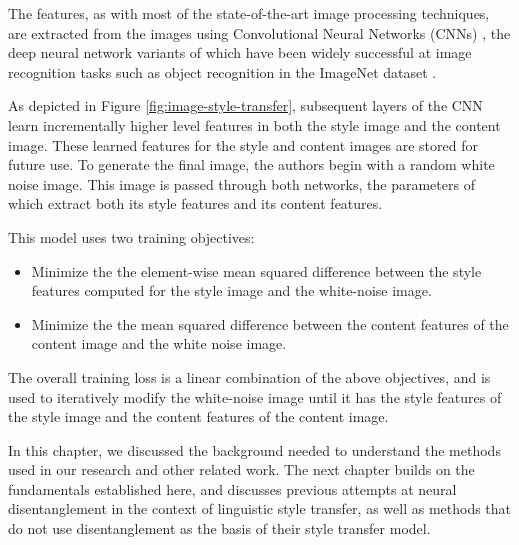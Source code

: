 The features, as with most of the state-of-the-art image processing techniques, are extracted from the images using Convolutional Neural Networks (CNNs) \citep{lecun1998gradient}, the deep neural network variants of which have been widely successful at image recognition tasks such as object recognition in the ImageNet dataset \citep{krizhevsky2012imagenet}.

As depicted in Figure \ref{fig:image-style-transfer}, subsequent layers of the CNN learn incrementally higher level features in both the style image and the content image. These learned features for the style and content images are stored for future use. To generate the final image, the authors begin with a random white noise image. This image is passed through both networks, the parameters of which extract both its style features and its content features.

This model uses two training objectives:
\begin{itemize}
	\item Minimize the the element-wise mean squared difference between the style features computed for the style image and the white-noise image.
	\item Minimize the the mean squared difference between the content features of the content image and the white noise image.
\end{itemize}

The overall training loss is a linear combination of the above objectives, and is used to iteratively modify the white-noise image until it has the style features of the style image and the content features of the content image.


In this chapter, we discussed the background needed to understand the methods used in our research and other related work. The next chapter builds on the fundamentals established here, and discusses previous attempts at neural disentanglement in the context of linguistic style transfer, as well as methods that do not use disentanglement as the basis of their style transfer model.
